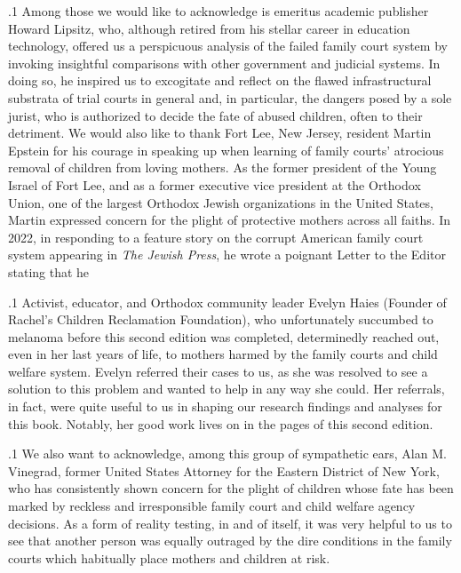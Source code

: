 \documentclass[11pt, twoside]{article}
\begin{document}
{\p.1{%
Among those we would like to acknowledge is emeritus academic
publisher Howard Lipsitz, who, although retired from his stellar career
in education technology, offered us a perspicuous analysis of the failed
family court system by invoking insightful comparisons with other government and judicial systems. In doing so, he inspired us to excogitate
and reflect on the flawed infrastructural substrata of trial courts in
general and, in particular, the dangers posed by a sole jurist, who is
authorized to decide the fate of abused children, often to their detriment.
We would also like to thank Fort Lee, New Jersey, resident Martin
Epstein for his courage in speaking up when learning of family courts’
atrocious removal of children from loving mothers. As the former president of the Young Israel of Fort Lee, and as a former executive vice
president at the Orthodox Union, one of the largest Orthodox Jewish
organizations in the United States, Martin expressed concern for the
plight of protective mothers across all faiths. In 2022, in responding to a
feature story on the corrupt American family court system appearing in
\textit{The Jewish Press}, he wrote a poignant Letter to the Editor stating that he
}%

\p.1{%
Activist, educator, and Orthodox community leader Evelyn
Haies (Fou\-nder of Rachel's Children Reclamation Foundation),
who unfortunately succumbed to melanoma before this second edition
was completed, determinedly reached out, even in her last years of life,
to mothers harmed by the family courts and child welfare system. Evelyn referred their cases to us, as she was resolved to see a solution to this
problem and wanted to help in any way she could. Her referrals, in fact,
were quite useful to us in shaping our research findings and analyses for
this book. Notably, her good work lives on in the pages of this second
edition.
}%

\p.1{%
We also want to acknowledge, among this group of sympathetic ears,
Alan M. Vinegrad, former United States Attorney for the Eastern District of New York, who has consistently shown concern for the plight
of children whose fate has been marked by reckless and irresponsible
family court and child welfare agency decisions. As a form of reality testing, in and of itself, it was very helpful to us to see that another person
was equally outraged by the dire conditions in the family courts which
habitually place mothers and children at risk.
}%

}
\end{document}

